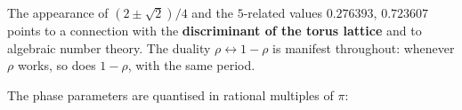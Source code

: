 \noindent The appearance of $(2\pm\sqrt2)/4$ and the $5$-related values
$0.276393$, $0.723607$ points to a connection with the
\textbf{discriminant of the torus lattice} and to algebraic number
theory. The duality $\rho \leftrightarrow 1-\rho$ is manifest
throughout: whenever $\rho$ works, so does $1-\rho$, with the same
period.

The phase parameters are quantised in rational multiples of $\pi$:
